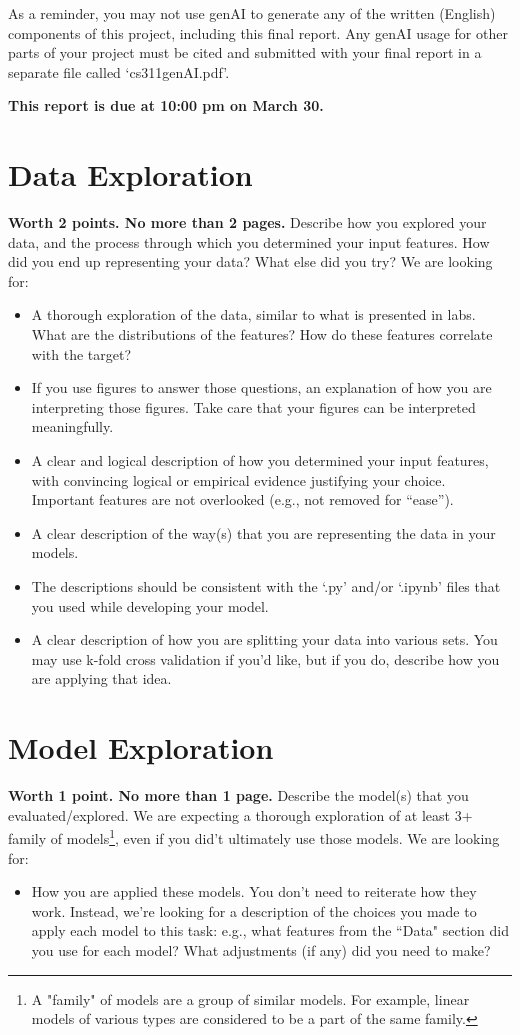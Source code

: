\documentclass[12pt]{article}
\begin{document}
As a reminder, you may not use genAI to generate any of the written (English) components of this project, including this final report.
Any genAI usage for other parts of your project must be cited and submitted with your final report in a separate file called `cs311genAI.pdf'.

\textbf{This report is due at 10:00 pm on March 30.}


\section{Data Exploration}

\textbf{Worth 2 points. No more than 2 pages.} Describe how you explored your data, and the process through
which you determined your input features. How did you end up representing your data?
What else did you try?  We are looking for:
\begin{itemize}
	\item A thorough exploration of the data, similar to what is presented in labs.
	What are the distributions of the features? How do these features correlate with the target?
	\item If you use figures to answer those questions, an explanation of how you are
	interpreting those figures. Take care that your figures can be interpreted
	meaningfully.
	\item A clear and logical description of how you determined your input features,
	with convincing logical or empirical evidence justifying your choice. 
	Important features are not overlooked (e.g., not removed for ``ease'').
	\item A clear description of the way(s) that you are representing the data in
	your models.
	\item The descriptions should be consistent with the `.py' and/or `.ipynb' files that you
	used while developing your model.
	\item A clear description of how you are splitting your data into various sets.
	You may use k-fold cross validation if you'd like, but if you do, describe how
	you are applying that idea.
\end{itemize}


\section{Model Exploration}

\textbf{Worth 1 point. No more than 1 page.} Describe the model(s) that you evaluated/explored.
We are expecting a thorough exploration of at least 3+ family of models\footnote{A "family" of models are
	a group of similar models. For example, linear models of various types are considered to be a part of
	the same family.}, even if you did't ultimately use those models.
We are looking for:
\begin{itemize}
	\item How you are applied these models. You don't need to reiterate how they work.
	Instead, we're looking for a description of the choices
	you made to apply each model to this task: e.g., what features from the ``Data" section
	did you use for each model? What adjustments (if any) did you need to make?
\end{itemize}
\end{document}
